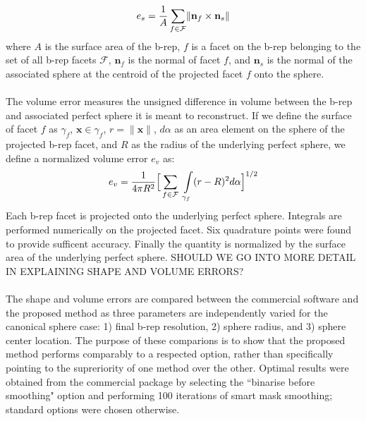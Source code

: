 \begin{equation} 
	e_s = \frac{1}{A} \sum \limits_{f\in\mathcal{F}} \lVert {\bf n}_f \times {\bf n}_s \rVert
\end{equation}
where $A$ is the surface area of the b-rep, $f$ is a facet on the b-rep belonging to the set of all b-rep facets $\mathcal{F}$, ${\bm n}_f$ is the normal of facet $f$, and ${\bm n}_s$ is the normal of the associated sphere at the centroid of the projected facet $f$ onto the sphere. \\ \\
%
The volume error measures the unsigned difference in volume between the b-rep and associated perfect sphere it is meant to reconstruct. If we define the surface of facet $f$ as $\gamma_f$,  ${\bm x} \in \gamma_f$, $r = \lVert {\bm x} \rVert$, $d\alpha$ as an area element on the sphere of the projected b-rep facet, and $R$ as the radius of the underlying perfect sphere, we define a normalized volume error $e_v$ as:
\begin{equation}
	e_v = \frac{1}{4\pi R^2} \Big[\sum \limits_{f \in \mathcal{F}\textsl{}} \ \int \limits_{\gamma_f} (r - R)^2 d\alpha \Big]^{1/2}
\end{equation}
Each b-rep facet is projected onto the underlying perfect sphere. Integrals are performed numerically on the projected facet. Six quadrature points were found to provide sufficent accuracy. Finally the quantity is normalized by the surface area of the underlying perfect sphere. SHOULD WE GO INTO MORE DETAIL IN EXPLAINING SHAPE AND VOLUME ERRORS? 
\\ \\
%
The shape and volume errors are compared between the commercial software and the proposed method as three parameters are independently varied for the canonical sphere case: 1) final b-rep resolution, 2) sphere radius, and 3) sphere center location. The purpose of these comparions is to show that the proposed method performs comparably to a respected option, rather than specifically pointing to the supreriority of one method over the other. Optimal results were obtained from the commercial package by selecting the ``binarise before smoothing" option and performing 100 iterations of smart mask smoothing; standard options were chosen otherwise. \\ \\
%
